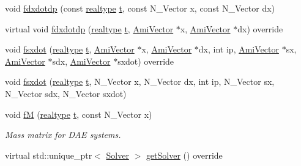 \begin{DoxyCompactItemize}
\item 
void \mbox{\hyperlink{classamici_1_1_model___d_a_e_a551dfccd2fb1aa618c644a580639f5b8}{fdxdotdp}} (const \mbox{\hyperlink{namespaceamici_a1bdce28051d6a53868f7ccbf5f2c14a3}{realtype}} \mbox{\hyperlink{classamici_1_1_model_a711281d57e9710226face29151cc4641}{t}}, const N\+\_\+\+Vector x, const N\+\_\+\+Vector dx)
\item 
virtual void \mbox{\hyperlink{classamici_1_1_model___d_a_e_afd60580b84c72713288796453f6da33a}{fdxdotdp}} (\mbox{\hyperlink{namespaceamici_a1bdce28051d6a53868f7ccbf5f2c14a3}{realtype}} \mbox{\hyperlink{classamici_1_1_model_a711281d57e9710226face29151cc4641}{t}}, \mbox{\hyperlink{classamici_1_1_ami_vector}{Ami\+Vector}} $\ast$x, \mbox{\hyperlink{classamici_1_1_ami_vector}{Ami\+Vector}} $\ast$dx) override
\item 
void \mbox{\hyperlink{classamici_1_1_model___d_a_e_a01f84575fd8df46a04fd472bbbc9d821}{fsxdot}} (\mbox{\hyperlink{namespaceamici_a1bdce28051d6a53868f7ccbf5f2c14a3}{realtype}} \mbox{\hyperlink{classamici_1_1_model_a711281d57e9710226face29151cc4641}{t}}, \mbox{\hyperlink{classamici_1_1_ami_vector}{Ami\+Vector}} $\ast$x, \mbox{\hyperlink{classamici_1_1_ami_vector}{Ami\+Vector}} $\ast$dx, int ip, \mbox{\hyperlink{classamici_1_1_ami_vector}{Ami\+Vector}} $\ast$sx, \mbox{\hyperlink{classamici_1_1_ami_vector}{Ami\+Vector}} $\ast$sdx, \mbox{\hyperlink{classamici_1_1_ami_vector}{Ami\+Vector}} $\ast$sxdot) override
\item 
void \mbox{\hyperlink{classamici_1_1_model___d_a_e_a26e76f86f173a718466c9cc19d68550a}{fsxdot}} (\mbox{\hyperlink{namespaceamici_a1bdce28051d6a53868f7ccbf5f2c14a3}{realtype}} \mbox{\hyperlink{classamici_1_1_model_a711281d57e9710226face29151cc4641}{t}}, N\+\_\+\+Vector x, N\+\_\+\+Vector dx, int ip, N\+\_\+\+Vector sx, N\+\_\+\+Vector sdx, N\+\_\+\+Vector sxdot)
\item 
void \mbox{\hyperlink{classamici_1_1_model___d_a_e_a82db0639f98056acc376569457c95ca4}{fM}} (\mbox{\hyperlink{namespaceamici_a1bdce28051d6a53868f7ccbf5f2c14a3}{realtype}} \mbox{\hyperlink{classamici_1_1_model_a711281d57e9710226face29151cc4641}{t}}, const N\+\_\+\+Vector x)
\begin{DoxyCompactList}\small\item\em Mass matrix for D\+AE systems. \end{DoxyCompactList}\item 
virtual std\+::unique\+\_\+ptr$<$ \mbox{\hyperlink{classamici_1_1_solver}{Solver}} $>$ \mbox{\hyperlink{classamici_1_1_model___d_a_e_aee7564098e889917627afd3c00772f81}{get\+Solver}} () override
\end{DoxyCompactItemize}
